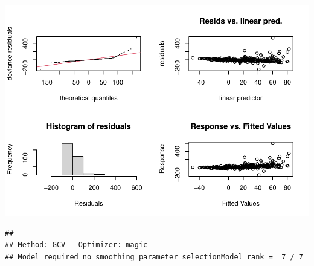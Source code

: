 \documentclass[]{elsarticle} %
\begin{document}
\includegraphics{Forest_and_Water_files/figure-latex/model3-1.pdf}

\begin{verbatim}
## 
## Method: GCV   Optimizer: magic
## Model required no smoothing parameter selectionModel rank =  7 / 7
\end{verbatim}
\end{document}
